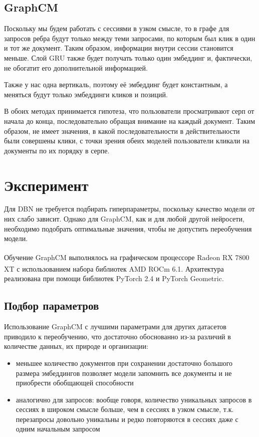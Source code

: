 \documentclass[diploma]{nanolab2015}
\begin{document}
\subsection{GraphCM}
Поскольку мы будем работать с сессиями в узком смысле, то в графе для запросов ребра будут только между теми запросами, по которым был клик в один и тот же документ. Таким образом, информации внутри сессии становится меньше. Слой GRU также будет получать только один эмбеддинг и, фактически, не обогатит его дополнительной информацией.

Также у нас одна вертикаль, поэтому её эмбеддинг будет константным, а меняться будут только эмбеддинги кликов и позиций.

\bigbreak

В обоих методах принимается гипотеза, что пользователи просматривают серп от начала до конца, последовательно обращая внимание на каждый документ. Таким образом, не имеет значения, в какой последовательности в действительности были совершены клики, с точки зрения обеих моделей пользователи кликали на документы по их порядку в серпе.
\section{Эксперимент}
Для DBN не требуется подбирать гиперпараметры, поскольку качество модели от них слабо зависит. Однако для GraphCM, как и для любой другой нейросети, необходимо подобрать оптимальные значения, чтобы не допустить переобучения модели.

Обучение GraphCM выполнялось на графическом процессоре Radeon\textsuperscript{\texttrademark} RX 7800 XT с использованием набора библиотек AMD ROCm\textsuperscript{\texttrademark} 6.1. Архитектура реализована при помощи библиотек PyTorch 2.4 и PyTorch Geometric.
\subsection{Подбор параметров}
Использование GraphCM с лучшими параметрами для других датасетов приводило к переобучению, что достаточно обоснованно из-за различий в количестве данных, их природе и организации:
\begin{itemize}
    \item меньшее количество документов при сохранении достаточно большого размера эмбеддингов позволяет модели запомнить все документы и не приобрести обобщающей способности
    \item аналогично для запросов: вообще говоря, количество уникальных запросов в сессиях в широком смысле больше, чем в сессиях в узком смысле, т.к. перезапросы довольно уникальны и редко повторяются в сессиях даже с одним начальным запросом
\end{itemize}
\end{document}
